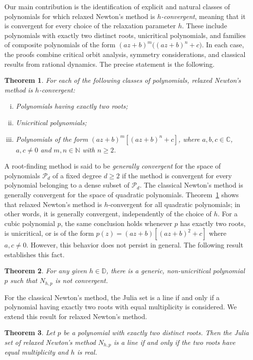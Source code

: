 \documentclass[12pt]{article}
\newtheorem{maintheorem}{Theorem}
\numberwithin{equation}{section}
\begin{document}
Our main contribution is the identification of explicit and natural classes of polynomials for which relaxed Newton's method is \emph{$h$-convergent}, meaning that it is convergent for every choice of the relaxation parameter $h$. These include polynomials with exactly two distinct roots, unicritical polynomials, and families of composite polynomials of the form $(az+b)^m\big((az+b)^n+c\big)$. In each case, the proofs combine critical orbit analysis, symmetry considerations, and classical results from rational dynamics. The precise statement is the following.
\begin{maintheorem}\label{Conv_cls}
For each of the following classes of polynomials, relaxed Newton's method is $h$-convergent:
\begin{enumerate}[(i)]
	\item Polynomials having exactly two roots;
	\item Unicritical polynomials;
	\item Polynomials of the form  $(a z+b)^{m}\left[(a z+b)^{n}+c\right]$, where $a, b, c \in \mathbb{C}$, $a, c \neq 0$ and $m, n \in \mathbb{N}$ with $n\geq 2$. 
\end{enumerate}
\end{maintheorem}
A root-finding method is said to be \textit{generally convergent} for the space of polynomials $\mathcal{P}_d$ of a fixed degree $d\geq 2$ if the method is convergent for every polynomial belonging to a dense subset of $\mathcal{P}_d$. The classical Newton's method is generally convergent for the space of quadratic polynomials. Theorem~\ref{Conv_cls} shows that relaxed Newton's method is $h$-convergent for all quadratic polynomials; in other words, it is generally convergent, independently of the choice of $h$. For a cubic polynomial $p$, the same conclusion holds whenever $p$ has exactly two roots, is unicritical, or is of the form $p(z)=(a z+b)\left[(a z+b)^{2}+c\right]$ where $a, c \neq 0$. However, this behavior does not persist in general. The following result establishes this fact.
\begin{maintheorem}\label{Cubic_nconv}
For any given $h\in \mathbb{D}$, there is a generic, non-unicritical polynomial $p$ such that $N_{h,p}$ is not convergent.
\end{maintheorem}
For the classical Newton's method, the Julia set is a line if and only if a polynomial having exactly two roots with equal multiplicity is considered. We extend this result for relaxed Newton's method.
\begin{maintheorem}\label{not_line}
	Let $p$ be a polynomial with exactly two distinct roots.
	Then the Julia set of relaxed Newton's method $N_{h,p}$ is a line if and only if the two roots have equal multiplicity and $h$ is real.
\end{maintheorem}
\end{document}
